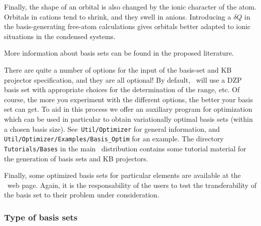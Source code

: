 Finally, the shape of an orbital is also changed by the ionic
character of the atom.  Orbitals in cations tend to shrink, and they
swell in anions.  Introducing a $\delta Q$ in the basis-generating
free-atom calculations gives orbitals better adapted to ionic
situations in the condensed systems.

More information about basis sets can be found in the proposed
literature.


\noindent

There are quite a number of options for the input of the basis-set and
KB projector specification, and they are all optional! By default,
\siesta\ will use a DZP basis set with appropriate choices for the
determination of the range, etc. Of course, the more you experiment
with the different options, the better your basis set can get. To aid
in this process we offer an auxiliary program for optimization which
can be used in particular to obtain variationally optimal basis sets
(within a chosen basis size). See \texttt{Util/Optimizer}
for general information, and \texttt{Util/Optimizer/Examples/Basis\_Optim}
for an example. The directory \texttt{Tutorials/Bases} in the main \siesta\
distribution contains some tutorial material for the generation of
basis sets and KB projectors.

Finally, some optimized basis sets for particular elements are
available at the \siesta\ web page.  Again, it is the
responsability of the users to test the transferability of the basis
set to their problem under consideration.


\subsubsection{Type of basis sets}

